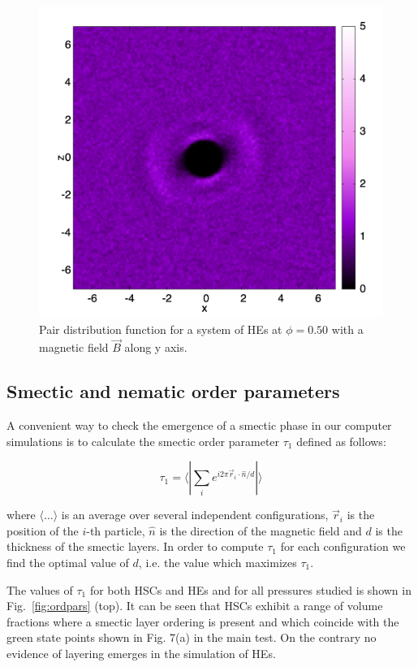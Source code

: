 \documentclass[aip,graphicx]{revtex4-1} %
\begin{document}
\begin{figure}
    \centering
    \includegraphics[width=0.4\columnwidth]{gxz_B_HE.png}
    \caption{Pair distribution function for a system of HEs at $\phi = 0.50$ with a magnetic field $\vec{B}$ along y axis.}\label{fig:gxz_B_HE}
\end{figure}

\subsection{Smectic and nematic order parameters}

A convenient way to check the emergence of a smectic phase in our computer simulations 
is to calculate the smectic order parameter $\tau_1$ defined as follows:

\begin{equation}
    \tau_1 = \langle | \sum_i e^{i 2\pi \vec{r}_i \cdot \hat{n} / d } |\rangle 
\end{equation}

where $\langle\ldots\rangle$ is an average over several independent configurations, $\vec{r}_i$ is the position of the $i$-th particle, $\hat{n}$ is the direction of the magnetic
field and $d$ is the thickness of the smectic layers.
In order to compute $\tau_1$ for each configuration we find the optimal value of $d$, i.e. 
the value which maximizes $\tau_1$.

The values of $\tau_1$ for both HSCs and HEs and for all pressures studied is shown in Fig.~\ref{fig:ordpars} (top). It can be seen that HSCs exhibit a range of volume fractions where 
a smectic layer ordering is present and which coincide with the green state points shown in Fig. 7(a)
in the main test. On the contrary no evidence of layering emerges in the simulation of HEs.
\end{document}
